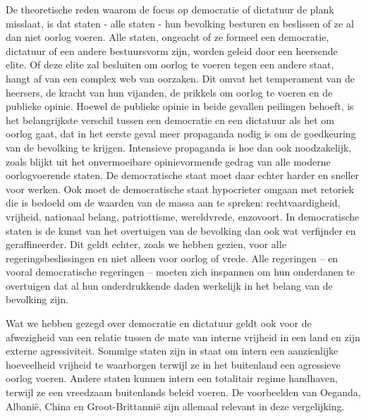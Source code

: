\documentclass[
  a5paper,
  smalldemyvopaper,10pt,twoside,onecolumn,openright,extrafontsizes,hidelinks]{memoir}
\begin{document}
De theoretische reden waarom de focus op democratie of dictatuur de
plank misslaat, is dat staten - alle staten - hun bevolking besturen en
beslissen of ze al dan niet oorlog voeren. Alle staten, ongeacht of ze
formeel een democratie, dictatuur of een andere bestuursvorm zijn,
worden geleid door een heersende elite. Of deze elite zal besluiten om
oorlog te voeren tegen een andere staat, hangt af van een complex web
van oorzaken. Dit omvat het temperament van de heersers, de kracht van
hun vijanden, de prikkels om oorlog te voeren en de publieke opinie.
Hoewel de publieke opinie in beide gevallen peilingen behoeft, is het
belangrijkste verschil tussen een democratie en een dictatuur als het om
oorlog gaat, dat in het eerste geval meer propaganda nodig is om de
goedkeuring van de bevolking te krijgen. Intensieve propaganda is hoe
dan ook noodzakelijk, zoals blijkt uit het onvermoeibare opinievormende
gedrag van alle moderne oorlogvoerende staten. De democratische staat
moet daar echter harder en sneller voor werken. Ook moet de
democratische staat hypocrieter omgaan met retoriek die is bedoeld om de
waarden van de massa aan te spreken: rechtvaardigheid, vrijheid,
nationaal belang, patriottisme, wereldvrede, enzovoort. In democratische
staten is de kunst van het overtuigen van de bevolking dan ook wat
verfijnder en geraffineerder. Dit geldt echter, zoals we hebben gezien,
voor alle regeringsbeslissingen en niet alleen voor oorlog of vrede.
Alle regeringen -- en vooral democratische regeringen -- moeten zich
inspannen om hun onderdanen te overtuigen dat al hun onderdrukkende
daden werkelijk in het belang van de bevolking zijn.

Wat we hebben gezegd over democratie en dictatuur geldt ook voor de
afwezigheid van een relatie tussen de mate van interne vrijheid in een
land en zijn externe agressiviteit. Sommige staten zijn in staat om
intern een aanzienlijke hoeveelheid vrijheid te waarborgen terwijl ze in
het buitenland een agressieve oorlog voeren. Andere staten kunnen intern
een totalitair regime handhaven, terwijl ze een vreedzaam buitenlands
beleid voeren. De voorbeelden van Oeganda, Albanië, China en
Groot-Brittannië zijn allemaal relevant in deze vergelijking.
\end{document}
